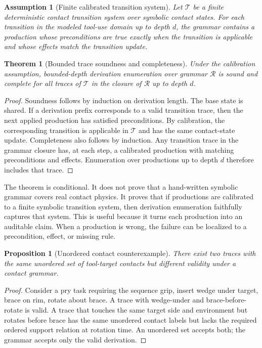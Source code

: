 \documentclass{article}
\newtheorem{theorem}{Theorem}
\newtheorem{proposition}{Proposition}
\newtheorem{assumption}{Assumption}
\newcommand{\Rules}{\mathcal{R}}
\begin{document}
\begin{assumption}[Finite calibrated transition system]
Let $\mathcal{T}$ be a finite deterministic contact transition system over symbolic contact states. For each transition in the modeled tool-use domain up to depth $d$, the grammar contains a production whose preconditions are true exactly when the transition is applicable and whose effects match the transition update.
\end{assumption}

\begin{theorem}[Bounded trace soundness and completeness]
Under the calibration assumption, bounded-depth derivation enumeration over grammar $\Rules$ is sound and complete for all traces of $\mathcal{T}$ in the closure of $\Rules$ up to depth $d$.
\end{theorem}

\begin{proof}
Soundness follows by induction on derivation length. The base state is shared. If a derivation prefix corresponds to a valid transition trace, then the next applied production has satisfied preconditions. By calibration, the corresponding transition is applicable in $\mathcal{T}$ and has the same contact-state update. Completeness also follows by induction. Any transition trace in the grammar closure has, at each step, a calibrated production with matching preconditions and effects. Enumeration over productions up to depth $d$ therefore includes that trace.
\end{proof}

The theorem is conditional. It does not prove that a hand-written symbolic grammar covers real contact physics. It proves that if productions are calibrated to a finite symbolic transition system, then derivation enumeration faithfully captures that system. This is useful because it turns each production into an auditable claim. When a production is wrong, the failure can be localized to a precondition, effect, or missing rule.

\begin{proposition}[Unordered contact counterexample]
There exist two traces with the same unordered set of tool-target contacts but different validity under a contact grammar.
\end{proposition}

\begin{proof}
Consider a pry task requiring the sequence grip, insert wedge under target, brace on rim, rotate about brace. A trace with wedge-under and brace-before-rotate is valid. A trace that touches the same target side and environment but rotates before brace has the same unordered contact labels but lacks the required ordered support relation at rotation time. An unordered set accepts both; the grammar accepts only the valid derivation.
\end{proof}
\end{document}
